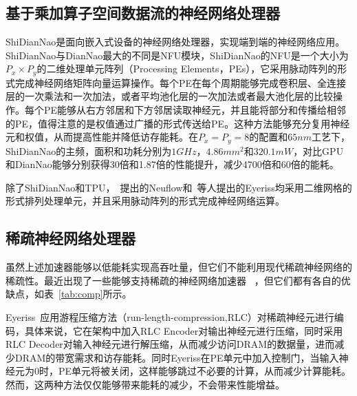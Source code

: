 \subsection{基于乘加算子空间数据流的神经网络处理器}
ShiDianNao是面向嵌入式设备的神经网络处理器，实现端到端的神经网络应用。ShiDianNao与DianNao最大的不同是NFU模块，ShiDianNao的NFU是一个大小为$P_x\times P_y$的二维处理单元阵列（Processing Elements，PEs），它采用脉动阵列的形式完成神经网络矩阵向量运算操作。每个PE在每个周期能够完成卷积层、全连接层的一次乘法和一次加法，或者平均池化层的一次加法或者最大池化层的比较操作。每个PE能够从右方邻居和下方邻居读取神经元，并且能将部分和传播给相邻的PE，值得注意的是权值通过广播的形式传送给PE。这种方法能够充分复用神经元和权值，从而提高性能并降低访存能耗。在$P_x=P_y=8$的配置和$65nm$工艺下，ShiDianNao的主频，面积和功耗分别为$1GHz$，$4.86mm^2$和$320.1mW$，对比GPU和DianNao能够分别获得30倍和1.87倍的性能提升，减少4700倍和60倍的能耗。


除了ShiDianNao和TPU，~\citet{farabet2011neuflow}提出的Neuflow和~\citet{chen2016eyeriss}等人提出的Eyeriss均采用二维网格的形式排列处理单元，并且采用脉动阵列的形式完成神经网络运算。

\subsection{稀疏神经网络处理器}
虽然上述加速器能够以低能耗实现高吞吐量，但它们不能利用现代稀疏神经网络的稀疏性。最近出现了一些能够支持稀疏的神经网络加速器~\cite{chen2017eyeriss,zhang2016cambricon,albericio2016cnvlutin,han2016eie,han2017ese,angshuman2017scnn}
，但它们都有各自的优缺点，如表~\ref{tab:comp}所示。

Eyeriss~\cite{chen2017eyeriss}应用游程压缩方法（run-length-compression,RLC）对稀疏神经元进行编码，具体来说，它在架构中加入RLC Encoder对输出神经元进行压缩，同时采用RLC Decoder对输入神经元进行解压缩，从而减少访问DRAM的数据量，进而减少DRAM的带宽需求和访存能耗。同时Eyeriss在PE单元中加入控制门，当输入神经元为0时，PE单元将被关闭，这样能够跳过不必要的计算，从而减少计算能耗。然而，这两种方法仅仅能够带来能耗的减少，不会带来性能增益。

